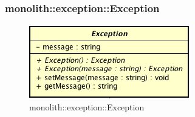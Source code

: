 \subsubsection{monolith::exception::Exception}

\label{monolith::exception::Exception}
\begin{figure}[H]
	\centering
	\includegraphics[scale=0.5]{Sezioni/SottosezioniST/img/app/Exception.png}
	\caption{monolith::exception::Exception}
\end{figure}

